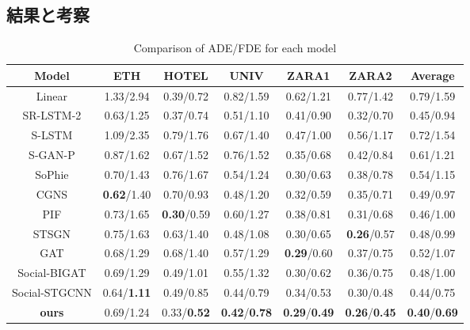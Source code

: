 \subsection{結果と考察}
\begin{table}[hbtp]
  \centering
  \caption{Comparison of ADE/FDE for each model\protect\footnotemark[6]}
  \label{tab:val-results}
  \footnotesize
  \begin{tabular}{c||c|c|c|c|c|c}
  Model & ETH & HOTEL & UNIV & ZARA1 & ZARA2 & Average \\
  \hline \hline
  Linear \cite{s-lstm} & 1.33/2.94 & 0.39/0.72 & 0.82/1.59 & 0.62/1.21 & 0.77/1.42 & 0.79/1.59 \\
  \hline
  SR-LSTM-2 \cite{sr-lstm} & 0.63/1.25 & 0.37/0.74 & 0.51/1.10 & 0.41/0.90 & 0.32/0.70 & 0.45/0.94 \\
  \hline
  S-LSTM \cite{s-lstm} & 1.09/2.35 & 0.79/1.76 & 0.67/1.40 & 0.47/1.00 & 0.56/1.17 & 0.72/1.54 \\
  \hline
  S-GAN-P \cite{gupta2018social-s-gan-p} & 0.87/1.62 & 0.67/1.52 & 0.76/1.52 & 0.35/0.68 & 0.42/0.84 & 0.61/1.21 \\
  \hline
  SoPhie \cite{sadeghian2019sophie} & 0.70/1.43 & 0.76/1.67 & 0.54/1.24 & 0.30/0.63 & 0.38/0.78 & 0.54/1.15 \\
  \hline
  CGNS \cite{li2019conditional-cgns} & \textbf{0.62}/1.40 & 0.70/0.93 & 0.48/1.20 & 0.32/0.59 & 0.35/0.71 & 0.49/0.97 \\
  \hline
  PIF \cite{liang2019peeking-pif} & 0.73/1.65 & \textbf{0.30}/0.59 & 0.60/1.27 & 0.38/0.81 & 0.31/0.68 & 0.46/1.00 \\
  \hline
  STSGN \cite{zhang2019stochastic-stsgn} & 0.75/1.63 & 0.63/1.40 & 0.48/1.08 & 0.30/0.65 & \textbf{0.26}/0.57 & 0.48/0.99 \\
  \hline
  GAT \cite{s-bigat} & 0.68/1.29 & 0.68/1.40 & 0.57/1.29 & \textbf{0.29}/0.60 & 0.37/0.75 & 0.52/1.07 \\
  \hline
  Social-BIGAT \cite{s-bigat} & 0.69/1.29 & 0.49/1.01 & 0.55/1.32 & 0.30/0.62 & 0.36/0.75 & 0.48/1.00 \\
  \hline
  Social-STGCNN\cite{s-stgcnn} & 0.64/\textbf{1.11} & 0.49/0.85 & 0.44/0.79 & 0.34/0.53 & 0.30/0.48 & 0.44/0.75 \\
  \hline \hline
  \textbf{ours} & 0.69/1.24 & 0.33/\textbf{0.52} & \textbf{0.42}/\textbf{0.78} & \textbf{0.29}/\textbf{0.49} & \textbf{0.26}/\textbf{0.45} & \textbf{0.40}/\textbf{0.69} \\
  \hline
  \end{tabular}
\end{table}

